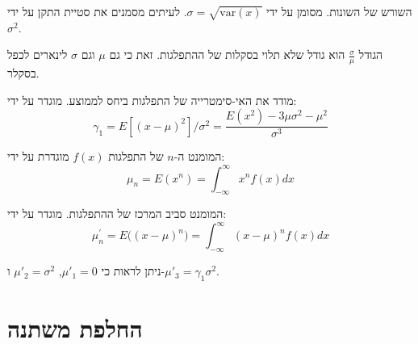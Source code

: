 \documentclass{tstextbook}
\begin{document}
\begin{definition}
השורש של השונות. מסומן על ידי \(\sigma=\sqrt{ \mathrm{var}(x) }\). לעיתים מסמנים את סטיית התקן על ידי \(\sigma^{2}\).

\end{definition}
\begin{remark}
הגודל \(\frac{\sigma}{\mu}\) הוא גודל שלא תלוי בסקלות של ההתפלגות. זאת כי גם \(\mu\) וגם \(\sigma\) לינארים לכפל בסקלר.

\end{remark}
\begin{definition}[צידוד]
מודד את האי-סימטרייה של התפלגות ביחס לממוצע. מוגדר על ידי:
$$\gamma_{1}=E[(x-\mu)^{2}]/\sigma^{2}={\frac{E(x^{2})-3\mu\sigma^{2}-\mu^{2}}{\sigma^{3}}}$$

\end{definition}
\begin{definition}[מומנט]
המומנט ה-\(n\) של התפלגות \(f(x)\) מוגדרת על ידי:
$$\mu_{n}=E(x^{n})=\int_{-\infty}^{\infty}x^{n}f(x)d x$$

\end{definition}
\begin{definition}
המומנט סביב המרכז של ההתפלגות. מוגדר על ידי:
$$\mu_{n}^{\prime}=E{\big(}(x-\mu)^{n}{\big)}=\int_{-\infty}^{\infty}(x-\mu)^{n}f(x)d x$$

\end{definition}
\begin{corollary}
ניתן לראות כי \(\mu'_{1}= 0\), \(\mu'_{2}=\sigma^{2}\) ו-\(\mu'_{3}=\gamma_{1}\sigma^{2}\).

\end{corollary}
\section{החלפת משתנה}
\end{document}
